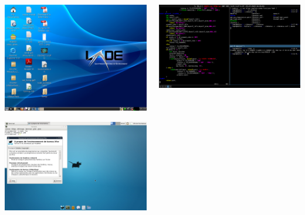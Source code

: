 \documentclass{lug}
\begin{document}
\begin{frame}
\begin{columns}
\begin{column}{0.3\textwidth}
            \includegraphics[width=\textwidth]{graphics/lxde} \par
            \vspace*{4pt}
            \includegraphics[width=\textwidth]{graphics/xfce} \par
        \end{column}
        \begin{column}{0.3\textwidth}
            \includegraphics[width=\textwidth]{graphics/i3} \par

\end{column}
\end{columns}
\end{frame}
\end{document}
